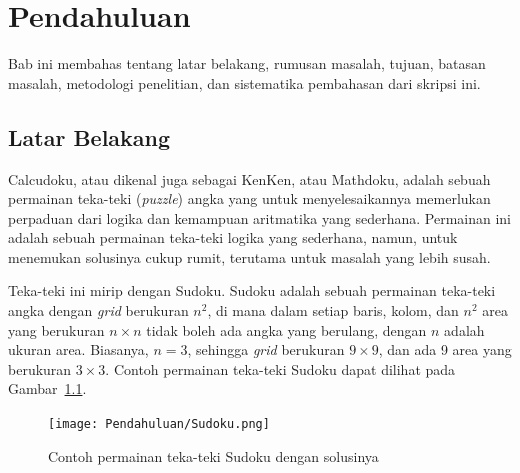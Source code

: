 \chapter{Pendahuluan}
\label{chap:pendahuluan}

Bab ini membahas tentang latar belakang, rumusan masalah, tujuan, batasan masalah, metodologi penelitian, dan sistematika pembahasan dari skripsi ini.

\section{Latar Belakang}
\label{sec:label}
Calcudoku, atau dikenal juga sebagai KenKen, atau Mathdoku, adalah sebuah permainan teka-teki (\textit{puzzle}) angka yang untuk menyelesaikannya memerlukan perpaduan dari logika dan kemampuan aritmatika yang sederhana. Permainan ini adalah sebuah permainan teka-teki logika yang sederhana, namun, untuk menemukan solusinya cukup rumit, terutama untuk masalah yang lebih susah.

Teka-teki ini mirip dengan Sudoku. Sudoku adalah sebuah permainan teka-teki angka dengan \textit{grid} berukuran \begin{math}n^2\end{math}, di mana dalam setiap baris, kolom, dan \begin{math}n^2\end{math} area yang berukuran \begin{math}n \times n\end{math} tidak boleh ada angka yang berulang, dengan \begin{math}n\end{math} adalah ukuran area. Biasanya, \begin{math}n = 3\end{math}, sehingga \textit{grid} berukuran \begin{math}9 \times 9\end{math}, dan ada 9 area yang berukuran \begin{math}3 \times 3\end{math}. Contoh permainan teka-teki Sudoku dapat dilihat pada Gambar~\ref{fig:sudoku}.

\begin{figure}
\centering
\captionsetup{justification=centering}
\texttt{[image: Pendahuluan/Sudoku.png]}
\caption[Contoh permainan teka-teki Sudoku dengan solusinya]{Contoh permainan teka-teki Sudoku dengan solusinya}
\label{fig:sudoku}
\end{figure}

